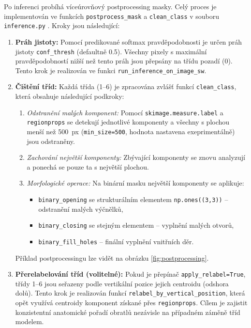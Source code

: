 \documentclass[male,czech,api_bc]{kitheses}
\begin{document}
Po inferenci probíhá víceúrovňový postprocessing masky. Celý proces je implementován ve funkcích \texttt{postprocess\_mask} a \texttt{clean\_class} v souboru \texttt{inference.py} . Kroky jsou následující:

\begin{enumerate}
  \item \textbf{Práh jistoty:} Pomocí predikované softmax pravděpodobnosti je určen práh jistoty \texttt{conf\-\_thresh} (defaultně 0.5). Všechny pixely s maximální pravděpodobností nižší než tento práh jsou přepsány na třídu pozadí (0). Tento krok je realizován ve funkci \texttt{run\_inference\-\_on\_image\_sw}.

  \item \textbf{Čištění tříd:} Každá třída (1–6) je zpracována zvlášť funkcí \texttt{clean\_class}, která obsahuje následující podkroky:
  \begin{enumerate}
    \item \textit{Odstranění malých komponent:} Pomocí \texttt{skimage.measure.label} a \texttt{region\-props} se detekují jednotlivé komponenty a všechny s plochou menší než 500~px (\texttt{min\_size=500}, hodnota nastavena exeprimentálně) jsou odstraněny.
    \item \textit{Zachování největší komponenty:} Zbývající komponenty se znovu analyzují a ponechá se pouze ta s největší plochou.
    \item \textit{Morfologické operace:} Na binární masku největší komponenty se aplikuje:
    \begin{itemize}
      \item \texttt{binary\_opening} se strukturálním elementem \texttt{np.ones((3,3))} -- odstranění malých výčnělků,
      \item \texttt{binary\_closing} se stejným elementem -- vyplnění malých otvorů,
      \item \texttt{binary\_fill\_holes} -- finální vyplnění vnitřních děr.
    \end{itemize}
  \end{enumerate}

  Příklad postprocessingu lze vidět na obrázku \ref{fig:postprocessing}.

  \item \textbf{Přerelabelování tříd (volitelné):} Pokud je přepínač \texttt{apply\_relabel=True}, třídy 1–6 jsou seřazeny podle vertikální pozice jejich centroidu (odshora dolů). Tento krok je realizován funkcí \texttt{relabel\_by\_vertical\_position}, která opět využívá centroidy komponent získané přes \texttt{regionprops}. Cílem je zajistit konzistentní anatomické pořadí obratlů nezávisle na případném záměně tříd modelem.
\end{enumerate}
\end{document}
